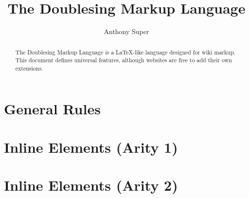 \documentclass{article}
\begin{document}
\title{The Doublesing Markup Language}
\author{Anthony Super}
\maketitle
\begin{abstract}
The Doublesing Markup Language is a \LaTeX-like language designed for wiki markup.
This document defines universal features, although websites are free to add their own extensions.
\end{abstract}
\section{General Rules}

\section{Inline Elements (Arity 1)}


\section{Inline Elements (Arity 2)}

\end{document}
